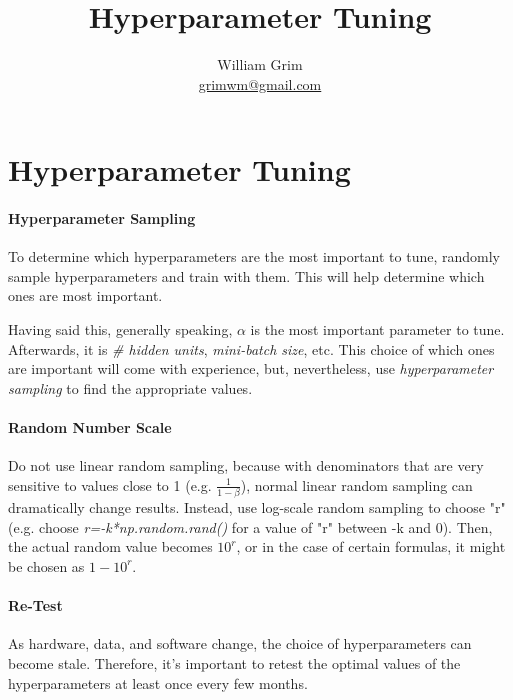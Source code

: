 \documentclass{article}
\begin{document}
\title {Hyperparameter Tuning}
\author{William Grim \\ \href{mailto:grimwm@gmail.com}{grimwm@gmail.com}}

\maketitle

\tableofcontents

\section{Hyperparameter Tuning}

\paragraph{Hyperparameter Sampling}

To determine which hyperparameters are the most important to tune, randomly sample hyperparameters and train with them.  This will help determine which ones are most important.

Having said this, generally speaking, $\alpha$ is the most important parameter to tune.  Afterwards, it is \textit{\# hidden units}, \textit{mini-batch size}, etc.  This choice of which ones are important will come with experience, but, nevertheless, use \textit{hyperparameter sampling} to find the appropriate values.

\paragraph{Random Number Scale}

Do not use linear random sampling, because with denominators that are very sensitive to values close to 1 (e.g. $\frac{1}{1-\beta}$), normal linear random sampling can dramatically change results.  Instead, use log-scale random sampling to choose "r" (e.g. choose \textit{r=-k*np.random.rand()} for a value of "r" between -k and 0).  Then, the actual random value becomes $10^r$, or in the case of certain formulas, it might be chosen as $1 - 10^r$.

\paragraph{Re-Test}

As hardware, data, and software change, the choice of hyperparameters can become stale.  Therefore, it's important to retest the optimal values of the hyperparameters at least once every few months.
\end{document}
